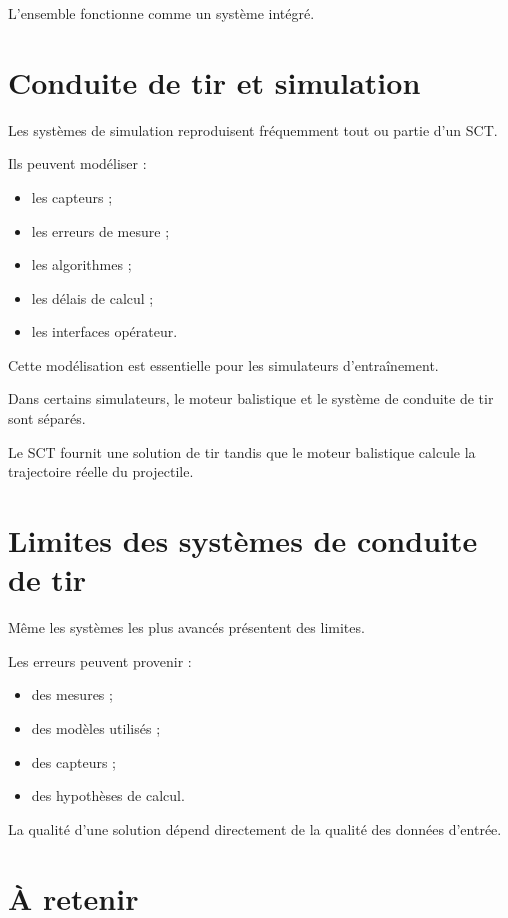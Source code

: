 L'ensemble fonctionne comme un système intégré.

\section{Conduite de tir et simulation}

Les systèmes de simulation reproduisent fréquemment tout ou partie d'un SCT.

Ils peuvent modéliser :

\begin{itemize}
    \item les capteurs ;
    \item les erreurs de mesure ;
    \item les algorithmes ;
    \item les délais de calcul ;
    \item les interfaces opérateur.
\end{itemize}

Cette modélisation est essentielle pour les simulateurs d'entraînement.

\begin{simulation}

Dans certains simulateurs, le moteur balistique et le système de conduite de
tir sont séparés.

Le SCT fournit une solution de tir tandis que le moteur balistique calcule
la trajectoire réelle du projectile.

\end{simulation}

\section{Limites des systèmes de conduite de tir}

Même les systèmes les plus avancés présentent des limites.

Les erreurs peuvent provenir :

\begin{itemize}
    \item des mesures ;
    \item des modèles utilisés ;
    \item des capteurs ;
    \item des hypothèses de calcul.
\end{itemize}

La qualité d'une solution dépend directement de la qualité des données
d'entrée.

\section{À retenir}

